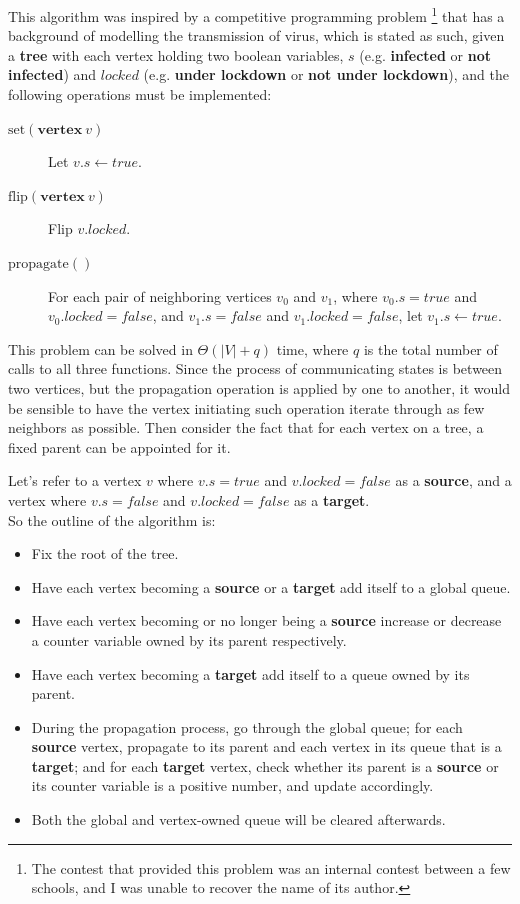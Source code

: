 \documentclass[12pt]{report}
\begin{document}
This algorithm was inspired by a competitive programming problem
\footnote{The contest that provided this problem was an internal contest between a few schools, and I was unable to recover the name of its author.}
that has a background of modelling the transmission of virus,
which is stated as such, given a \textbf{tree} with each vertex holding two boolean variables,
$ s $ (e.g. \textbf{infected} or \textbf{not infected}) and $ \mathit{locked} $ (e.g. \textbf{under lockdown} or \textbf{not under lockdown}), and the following operations must be implemented:

\begin{description}
	\item [$ \mathrm{set}(\mathbf{vertex}\ v) $] Let $ v.s \gets \mathit{true} $.
	\item [$ \mathrm{flip}(\mathbf{vertex}\ v) $] Flip $ v.\mathit{locked} $.
	\item [$ \mathrm{propagate}() $] \sloppy For each pair of neighboring vertices $ v_0 $ and $ v_1 $, where $ v_0.s = \mathit{true} $ and $ v_0.\mathit{locked} = \mathit{false} $,
		and $ v_1.s = \mathit{false} $ and $ v_1.\mathit{locked} = \mathit{false} $, let $ v_1.s \gets \mathit{true} $.
\end{description}

This problem can be solved in $ \Theta\left(\lvert V \rvert + q \right) $ time, where $ q $ is the total number of calls to all three functions.
Since the process of communicating states is between two vertices, but the propagation operation is applied by one to another,
it would be sensible to have the vertex initiating such operation iterate through as few neighbors as possible.
Then consider the fact that for each vertex on a tree, a fixed parent can be appointed for it.

\bigskip

Let's refer to a vertex $ v $ where $ v.s = \mathit{true} $ and $ v.\mathit{locked} = \mathit{false} $ as a \textbf{source}, and a vertex where $ v.s = \mathit{false} $ and $ v.\mathit{locked} = \mathit{false} $ as a \textbf{target}. \\
So the outline of the algorithm is:
\begin{itemize}
	\item Fix the root of the tree.
	\item Have each vertex becoming a \textbf{source} or a \textbf{target} add itself to a global queue.
	\item Have each vertex becoming or no longer being a \textbf{source} increase or decrease a counter variable owned by its parent respectively.
	\item Have each vertex becoming a \textbf{target} add itself to a queue owned by its parent.
	\item During the propagation process, go through the global queue;
		  for each \textbf{source} vertex, propagate to its parent and each vertex in its queue that is a \textbf{target};
		  and for each \textbf{target} vertex, check whether its parent is a \textbf{source} or its counter variable is a positive number,
		  and update accordingly.
	\item Both the global and vertex-owned queue will be cleared afterwards.
\end{itemize}
\end{document}
